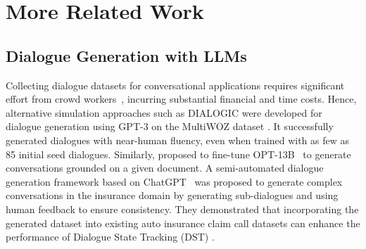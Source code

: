 
\section{More Related Work}
\subsection{Dialogue Generation with LLMs}

Collecting dialogue datasets for conversational applications requires significant effort from crowd workers~\cite{ %
budzianowski-etal-2018-multiwoz, wu-etal-2020-tod}, incurring substantial financial and time costs. Hence, alternative simulation approaches such as DIALOGIC were developed for dialogue generation using GPT-3 \cite{brown2020language} on the MultiWOZ dataset \cite{han2021multiwoz}.
It successfully generated dialogues with near-human fluency, even when trained with as few as 85 initial seed dialogues.
Similarly, \citet{li-etal-2023-autoconv} proposed to fine-tune OPT-13B~\cite{zhang2022opt} to generate conversations grounded on a given document. 
A semi-automated dialogue generation framework based on ChatGPT~\cite{lu2023dialgen} was proposed to generate complex conversations in the insurance domain by generating sub-dialogues and using human feedback to ensure consistency.
They demonstrated that incorporating the generated dataset into existing auto insurance claim call datasets can enhance the performance of Dialogue State Tracking (DST) \cite{young2010hidden}. 

